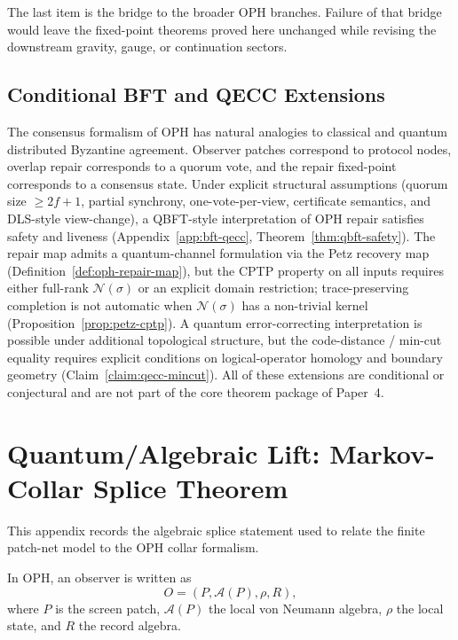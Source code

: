 \documentclass[11pt]{article}
\theoremstyle{remark}
\theoremstyle{plain}
\begin{document}
The last item is the bridge to the broader OPH branches. Failure of that bridge would leave the
fixed-point theorems proved here unchanged while revising the downstream gravity, gauge, or
continuation sectors.

\subsection{Conditional BFT and QECC Extensions}
\label{subsec:conditional-bft-qecc}

The consensus formalism of \textrm{OPH} has natural analogies to classical and quantum
distributed Byzantine agreement. Observer patches correspond to protocol nodes, overlap repair
corresponds to a quorum vote, and the repair fixed-point corresponds to a consensus state. Under
explicit structural assumptions (quorum size $\geq 2f+1$, partial synchrony, one-vote-per-view,
certificate semantics, and \textrm{DLS}-style view-change), a \textrm{QBFT}-style interpretation
of \textrm{OPH} repair satisfies safety and liveness (Appendix~\ref{app:bft-qecc},
Theorem~\ref{thm:qbft-safety}). The repair map admits a quantum-channel formulation via the Petz
recovery map (Definition~\ref{def:oph-repair-map}), but the \textrm{CPTP} property on all inputs
requires either full-rank $\mathcal{N}(\sigma)$ or an explicit domain restriction; trace-preserving
completion is not automatic when $\mathcal{N}(\sigma)$ has a non-trivial kernel
(Proposition~\ref{prop:petz-cptp}). A quantum error-correcting interpretation is possible under
additional topological structure, but the code-distance / min-cut equality requires explicit
conditions on logical-operator homology and boundary geometry (Claim~\ref{claim:qecc-mincut}). All
of these extensions are conditional or conjectural and are not part of the core theorem package of
Paper~4.


\appendix
\section{Quantum/Algebraic Lift: Markov-Collar Splice Theorem}\label{app:splice}

This appendix records the algebraic splice statement used to relate the finite patch-net model to
the OPH collar formalism.

In OPH, an observer is written as
\[
O=(P,\mathcal{A}(P),\rho,R),
\]
where $P$ is the screen patch, $\mathcal{A}(P)$ the local von Neumann algebra, $\rho$ the local state, and $R$ the record algebra.
\end{document}
